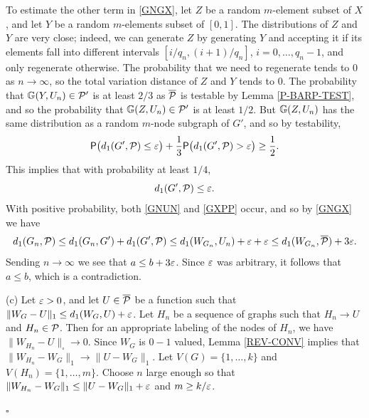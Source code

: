\documentclass{article}
\newenvironment{proof}{\medskip\noindent{\bf Proof. }}{\hfill$\square$\medskip}
\begin{document}
\begin{proof}
To estimate the other term in \eqref{GNGX}, let $Z$ be a random
$m$-element subset of $X$, and let $Y$ be a random $m$-elements
subset of $[0,1]$. The distributions of $Z$ and $Y$ are very close;
indeed, we can generate $Z$ by generating $Y$ and accepting it if its
elements fall into different intervals $[i/q_n, (i+1)/q_n]$,
$i=0,\dots,q_n-1$, and only regenerate otherwise. The probability
that we need to regenerate tends to $0$ as $n\to\infty$, so the total
variation distance of $Z$ and $Y$ tends to $0$. The probability that
${\mathbb G}(Y,U_n)\in\mathcal{P}'$ is at least $2/3$ as $\overline{\mathcal{P}}$ is testable
by Lemma \ref{P-BARP-TEST}, and so the probability that
${\mathbb G}(Z,U_n)\in\mathcal{P}'$ is at least $1/2$. But ${\mathbb G}(Z,U_n)$ has the same
distribution as a random $m$-node subgraph of $G'$, and so by
testability,
\[
{\sf P}\bigl(d_1(G',\mathcal{P})\le\varepsilon\bigr) + \frac13
{\sf P}\bigl(d_1(G',\mathcal{P})>\varepsilon\bigr) \ge \frac12.
\]
This implies that with probability at least $1/4$,
\begin{equation}\label{GXPP}
d_1(G', \mathcal{P})\le\varepsilon.
\end{equation}
With positive probability, both \eqref{GNUN} and \eqref{GXPP} occur,
and so by \eqref{GNGX} we have
\[
d_1(G_n, \mathcal{P}) \le d_1(G_n,G')+d_1(G', \mathcal{P}) \le d_1(W_{G_n},U_n)+\varepsilon
+ \varepsilon \le d_1(W_{G_n},\overline{\mathcal{P}})+3\varepsilon.
\]
Sending $n\to\infty$ we see that $a\le b+3\varepsilon$. Since $\varepsilon$ was
arbitrary, it follows that $a\le b$, which is a contradiction.

(c) Let $\varepsilon>0$, and let $U\in\overline{\mathcal{P}}$ be a function such
that $\|W_G-U\|_1\le d_1(W_G,U)+\varepsilon$. Let $H_n$ be a sequence of
graphs such that $H_n\to U$ and $H_n\in\mathcal{P}$. Then for an appropriate
labeling of the nodes of $H_n$, we have $\|W_{H_n}-U\|_\square \to
0$. Since $W_G$ is $0-1$ valued, Lemma \ref{REV-CONV} implies that
$\|W_{H_n}-W_G\|_1 \to \|U-W_G\|_1$. Let $V(G)=\{1,\dots,k\}$ and
$V(H_n)=\{1,\dots,m\}$. Choose $n$ large enough so that
$\|W_{H_n}-W_G\|_1 \le\|U-W_G\|_1+\varepsilon$ and $m\ge k/\varepsilon$.


\end{proof}
\end{document}
